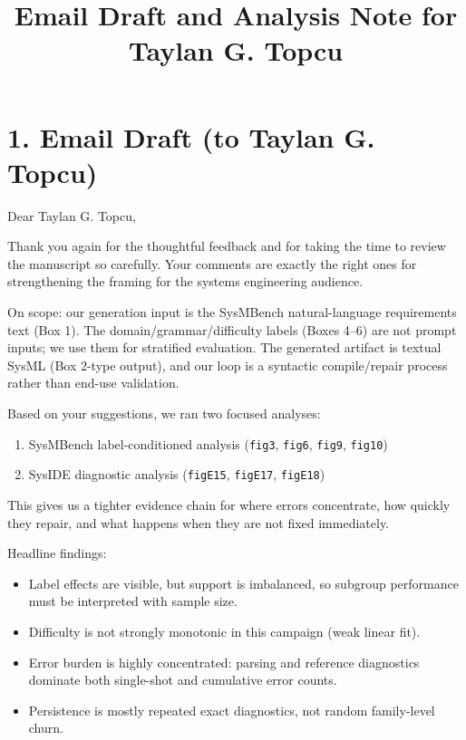 \documentclass[11pt]{article}
\title{Email Draft and Analysis Note for Taylan G. Topcu}
\date{}
\begin{document}
\maketitle

\section*{1. Email Draft (to Taylan G. Topcu)}
\noindent
Dear Taylan G. Topcu,

\medskip
\noindent
Thank you again for the thoughtful feedback and for taking the time to review the manuscript so carefully. Your comments are exactly the right ones for strengthening the framing for the systems engineering audience.

\medskip
\noindent
On scope: our generation input is the SysMBench natural-language requirements text (Box 1). The domain/grammar/difficulty labels (Boxes 4--6) are not prompt inputs; we use them for stratified evaluation. The generated artifact is textual SysML (Box 2-type output), and our loop is a syntactic compile/repair process rather than end-use validation.

\medskip
\noindent
Based on your suggestions, we ran two focused analyses:
\begin{enumerate}
    \item SysMBench label-conditioned analysis (\texttt{fig3}, \texttt{fig6}, \texttt{fig9}, \texttt{fig10})
    \item SysIDE diagnostic analysis (\texttt{figE15}, \texttt{figE17}, \texttt{figE18})
\end{enumerate}

\noindent
This gives us a tighter evidence chain for where errors concentrate, how quickly they repair, and what happens when they are not fixed immediately.

\medskip
\noindent
Headline findings:
\begin{itemize}
    \item Label effects are visible, but support is imbalanced, so subgroup performance must be interpreted with sample size.
    \item Difficulty is not strongly monotonic in this campaign (weak linear fit).
    \item Error burden is highly concentrated: parsing and reference diagnostics dominate both single-shot and cumulative error counts.
    \item Persistence is mostly repeated exact diagnostics, not random family-level churn.
\end{itemize}
\end{document}
